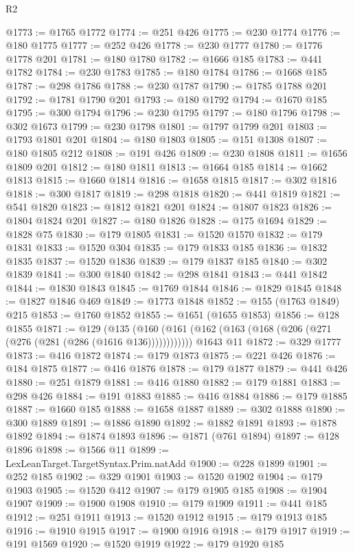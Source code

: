 \begin{lexlean}{R2}
\begin{coremodule}
@1773 := @1765 @1772
@1774 := @251 @426
@1775 := @230 @1774
@1776 := @180 @1775
@1777 := @252 @426
@1778 := @230 @1777
@1780 := @1776 @1778 @201
@1781 := @180 @1780
@1782 := @1666 @185
@1783 := @441 @1782
@1784 := @230 @1783
@1785 := @180 @1784
@1786 := @1668 @185
@1787 := @298 @1786
@1788 := @230 @1787
@1790 := @1785 @1788 @201
@1792 := @1781 @1790 @201
@1793 := @180 @1792
@1794 := @1670 @185
@1795 := @300 @1794
@1796 := @230 @1795
@1797 := @180 @1796
@1798 := @302 @1673
@1799 := @230 @1798
@1801 := @1797 @1799 @201
@1803 := @1793 @1801 @201
@1804 := @180 @1803
@1805 := @151 @1308
@1807 := @180 @1805 @212
@1808 := @191 @426
@1809 := @230 @1808
@1811 := @1656 @1809 @201
@1812 := @180 @1811
@1813 := @1664 @185
@1814 := @1662 @1813
@1815 := @1660 @1814
@1816 := @1658 @1815
@1817 := @302 @1816
@1818 := @300 @1817
@1819 := @298 @1818
@1820 := @441 @1819
@1821 := @541 @1820
@1823 := @1812 @1821 @201
@1824 := @1807 @1823
@1826 := @1804 @1824 @201
@1827 := @180 @1826
@1828 := @175 @1694
@1829 := @1828 @75
@1830 := @179 @1805
@1831 := @1520 @1570
@1832 := @179 @1831
@1833 := @1520 @304
@1835 := @179 @1833 @185
@1836 := @1832 @1835
@1837 := @1520 @1836
@1839 := @179 @1837 @185
@1840 := @302 @1839
@1841 := @300 @1840
@1842 := @298 @1841
@1843 := @441 @1842
@1844 := @1830 @1843
@1845 := @1769 @1844
@1846 := @1829 @1845
@1848 := @1827 @1846 @469
@1849 := @1773 @1848
@1852 := @155 (@1763 @1849) @215
@1853 := @1760 @1852
@1855 := @1651 (@1655 @1853)
@1856 := @128 @1855
@1871 := @129
    (@135 (@160 (@161 (@162 (@163 (@168 (@206 (@271 (@276 (@281 (@286 (@1616 @136))))))))))))
    @1643
    @11
@1872 := @329 @1777
@1873 := @416 @1872
@1874 := @179 @1873
@1875 := @221 @426
@1876 := @184 @1875
@1877 := @416 @1876
@1878 := @179 @1877
@1879 := @441 @426
@1880 := @251 @1879
@1881 := @416 @1880
@1882 := @179 @1881
@1883 := @298 @426
@1884 := @191 @1883
@1885 := @416 @1884
@1886 := @179 @1885
@1887 := @1660 @185
@1888 := @1658 @1887
@1889 := @302 @1888
@1890 := @300 @1889
@1891 := @1886 @1890
@1892 := @1882 @1891
@1893 := @1878 @1892
@1894 := @1874 @1893
@1896 := @1871 (@761 @1894)
@1897 := @128 @1896
@1898 := @1566 @11
@1899 := LexLeanTarget.TargetSyntax.Prim.natAdd
@1900 := @228 @1899
@1901 := @252 @185
@1902 := @329 @1901
@1903 := @1520 @1902
@1904 := @179 @1903
@1905 := @1520 @412
@1907 := @179 @1905 @185
@1908 := @1904 @1907
@1909 := @1900 @1908
@1910 := @179 @1909
@1911 := @441 @185
@1912 := @251 @1911
@1913 := @1520 @1912
@1915 := @179 @1913 @185
@1916 := @1910 @1915
@1917 := @1900 @1916
@1918 := @179 @1917
@1919 := @191 @1569
@1920 := @1520 @1919
@1922 := @179 @1920 @185

\end{coremodule}
\end{lexlean}
